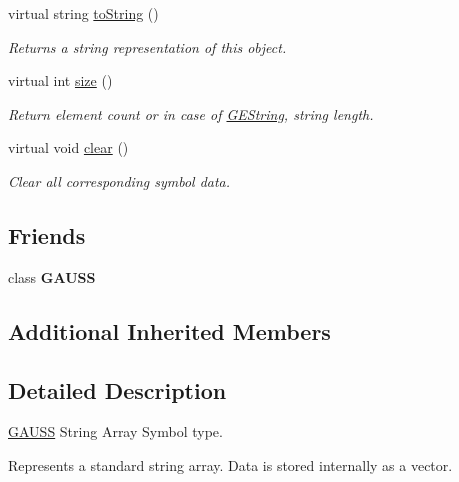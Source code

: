 \begin{DoxyCompactItemize}
virtual string \hyperlink{class_g_e_string_array_ab74fcbfee54edd0db02b61b299b3a7af}{to\-String} ()
\begin{DoxyCompactList}\small\item\em Returns a string representation of this object. \end{DoxyCompactList}\item 
virtual int \hyperlink{class_g_e_string_array_aa713dfa2931e223578a9fe41e3acd85d}{size} ()
\begin{DoxyCompactList}\small\item\em Return element count or in case of \hyperlink{class_g_e_string}{G\-E\-String}, string length. \end{DoxyCompactList}\item 
virtual void \hyperlink{class_g_e_string_array_a9bd5bd32a9efeb1e74128bd1d7c5c57d}{clear} ()
\begin{DoxyCompactList}\small\item\em Clear all corresponding symbol data. \end{DoxyCompactList}\end{DoxyCompactItemize}
\subsection*{Friends}
\begin{DoxyCompactItemize}
\item 
\hypertarget{class_g_e_string_array_abc89e64d0ec6c939575c3125753c6309}{class {\bfseries G\-A\-U\-S\-S}}\label{class_g_e_string_array_abc89e64d0ec6c939575c3125753c6309}

\end{DoxyCompactItemize}
\subsection*{Additional Inherited Members}


\subsection{Detailed Description}
\hyperlink{class_g_a_u_s_s}{G\-A\-U\-S\-S} String Array Symbol type. 

Represents a standard string array. Data is stored internally as a vector. 

